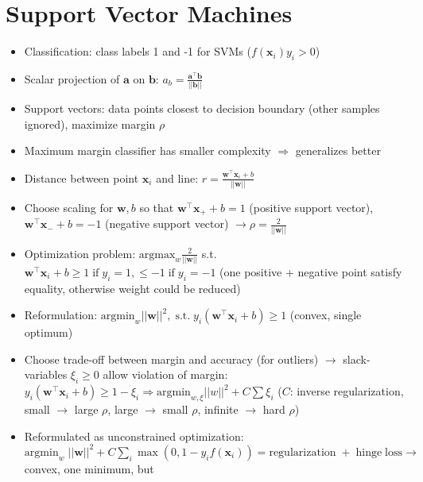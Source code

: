 \documentclass[11pt]{scrartcl}
\begin{document}
\section{Support Vector Machines}

\begin{itemize}
    \item Classification: class labels 1 and -1 for SVMs (\(f ( \bm{x}_i ) y_i > 0 \))
    \item Scalar projection of \( \bm{a} \) on \( \bm{b} \): \( a_b = 
        \frac{\bm{a}^\top \bm{b}}{|| \bm{b} ||} \)
    \item Support vectors: data points closest to decision boundary (other samples ignored), 
        maximize margin \( \rho \)
    \item Maximum margin classifier has smaller complexity \( \Rightarrow \) generalizes better
    \item Distance between point \( \bm{x}_i \) and line: \( r = 
        \frac{\bm{w}^\top \bm{x}_i + b}{|| \bm{w} ||} \)
    \item Choose scaling for \( \bm{w}, b \) so that \( \bm{w}^\top \bm{x}_+ + b = 1 \) 
        (positive support vector), \( \bm{w}^\top \bm{x}_- + b = -1 \) (negative support 
        vector) \( \rightarrow \rho = \frac{2}{|| \bm{w} ||} \)
    \item Optimization problem: \( \mathrm{argmax}_w \frac{2}{|| \bm{w} ||} \) s.t. 
        \( \bm{w}^\top \bm{x}_i + b \geq 1 \; \mathrm{if} \; y_i = 
        1, \leq - 1 \; \mathrm{if} \; y_i = - 1 \) (one positive + negative point satisfy 
        equality, otherwise weight could be reduced)
    \item Reformulation: \( \mathrm{argmin}_w || \bm{w} ||^2, \; \mathrm{s.t.} \; 
        y_i ( \bm{w}^\top \bm{x}_i + b ) \geq 1 \) (convex, single optimum)
    \item Choose trade-off between margin and accuracy (for outliers) \( \rightarrow \) 
        slack-variables \( \xi_i \geq 0 \) allow violation of margin: 
        \( y_i ( \bm{w}^\top \bm{x}_i + b ) \geq 1 - \xi_i \Rightarrow 
        \mathrm{argmin}_{w, \xi} || w ||^2 + C \sum \xi_i \) (\( C \): inverse regularization, 
        small \( \rightarrow \) large \( \rho \), large \( \rightarrow \) small \( \rho \), 
        infinite \( \rightarrow \) hard \( \rho\))
    \item Reformulated as unconstrained optimization: 
        \( \mathrm{argmin}_w \; || \bm{w} ||^2 + C \sum_i \max ( 0, 1 - y_i f ( \bm{x}_i )) = 
        \mathrm{regularization} \; + \; \mathrm{hinge} \; \mathrm{loss} \rightarrow \) convex, one minimum, but 

\end{itemize}
\end{document}
